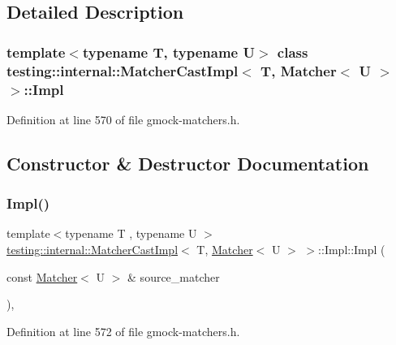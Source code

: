 \subsection{Detailed Description}
\subsubsection*{template$<$typename T, typename U$>$\newline
class testing\+::internal\+::\+Matcher\+Cast\+Impl$<$ T, Matcher$<$ U $>$ $>$\+::\+Impl}



Definition at line 570 of file gmock-\/matchers.\+h.



\subsection{Constructor \& Destructor Documentation}
\mbox{\label{classtesting_1_1internal_1_1MatcherCastImpl_3_01T_00_01Matcher_3_01U_01_4_01_4_1_1Impl_adcffa298fd17f1827311420b2075aaab}} 
\subsubsection{\texorpdfstring{Impl()}{Impl()}}
{\footnotesize\ttfamily template$<$typename T , typename U $>$ \\
\hyperlink{classtesting_1_1internal_1_1MatcherCastImpl}{testing\+::internal\+::\+Matcher\+Cast\+Impl}$<$ T, \hyperlink{classtesting_1_1Matcher}{Matcher}$<$ U $>$ $>$\+::Impl\+::\+Impl (\begin{DoxyParamCaption}\item[{const \hyperlink{classtesting_1_1Matcher}{Matcher}$<$ U $>$ \&}]{source\+\_\+matcher }\end{DoxyParamCaption})\hspace{0.3cm}{\ttfamily [inline]}, {\ttfamily [explicit]}}



Definition at line 572 of file gmock-\/matchers.\+h.


